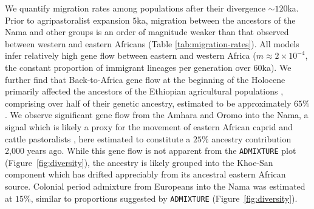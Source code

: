 \documentclass[]{article}
\begin{document}
We quantify migration rates among populations after their divergence
$\sim120$ka. Prior to agripastoralist expansion $5$ka, migration between the
ancestors of the Nama and other groups is an order of magnitude weaker than
that observed between western and eastern Africans (Table
\ref{tab:migration-rates}). All models infer relatively high gene flow between
eastern and western Africa ($m\approx2\times10^{-4}$, the constant proportion
of immigrant lineages per generation over $60$ka). We further find that
Back-to-Africa gene flow at the beginning of the Holocene primarily affected
the ancestors of the Ethiopian agricultural populations
\citep{Molinaro2019-rf}, comprising over half of their genetic ancestry,
estimated to be approximately $65\%$. We observe significant gene flow from the
Amhara and Oromo into the Nama, a signal which is likely a proxy for the
movement of eastern African caprid and cattle pastoralists
\citep{Henn2008-xo,Breton2014-xb}, here estimated to constitute a $25\%$ ancestry
contribution 2,000 years ago. While this gene flow is not apparent from the
\texttt{ADMIXTURE} plot (Figure~\ref{fig:diversity}), the ancestry is likely grouped
into the Khoe-San component which has drifted appreciably from its ancestral
eastern African source. Colonial period admixture from Europeans into the Nama
was estimated at $15\%$, similar to proportions suggested by \texttt{ADMIXTURE}
(Figure~\ref{fig:diversity}).
\end{document}

